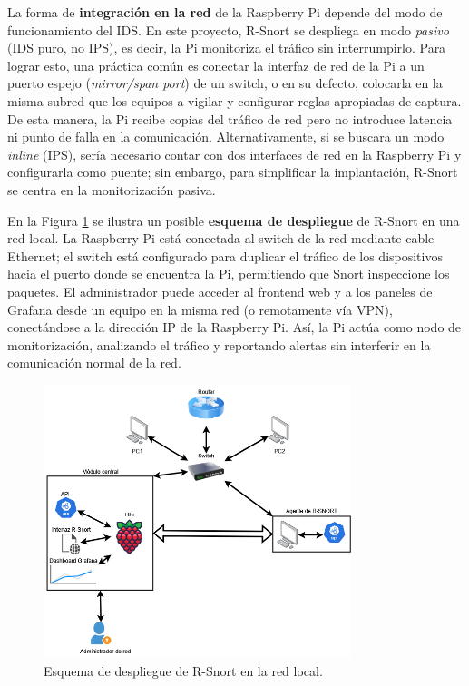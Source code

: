\documentclass[11pt,a4paper,twoside]{report}
\begin{document}
La forma de \textbf{integración en la red} de la Raspberry Pi depende del modo de funcionamiento del IDS. En este proyecto, R-Snort se despliega en modo \emph{pasivo} (IDS puro, no IPS), es decir, la Pi monitoriza el tráfico sin interrumpirlo. Para lograr esto, una práctica común es conectar la interfaz de red de la Pi a un puerto espejo (\emph{mirror/span port}) de un switch, o en su defecto, colocarla en la misma subred que los equipos a vigilar y configurar reglas apropiadas de captura. De esta manera, la Pi recibe copias del tráfico de red pero no introduce latencia ni punto de falla en la comunicación. Alternativamente, si se buscara un modo \emph{inline} (IPS), sería necesario contar con dos interfaces de red en la Raspberry Pi y configurarla como puente; sin embargo, para simplificar la implantación, R-Snort se centra en la monitorización pasiva.\newline

En la Figura \ref{fig:despliegue} se ilustra un posible \textbf{esquema de despliegue} de R-Snort en una red local. La Raspberry Pi está conectada al switch de la red mediante cable Ethernet; el switch está configurado para duplicar el tráfico de los dispositivos hacia el puerto donde se encuentra la Pi, permitiendo que Snort inspeccione los paquetes. El administrador puede acceder al frontend web y a los paneles de Grafana desde un equipo en la misma red (o remotamente vía VPN), conectándose a la dirección IP de la Raspberry Pi. Así, la Pi actúa como nodo de monitorización, analizando el tráfico y reportando alertas sin interferir en la comunicación normal de la red.\newline

\begin{figure}[hbtp]
	\centering
	\includegraphics[width=0.8\textwidth]{documento/4.png}
	\caption{Esquema de despliegue de R-Snort en la red local.}
	\label{fig:despliegue}
\end{figure}
\end{document}
